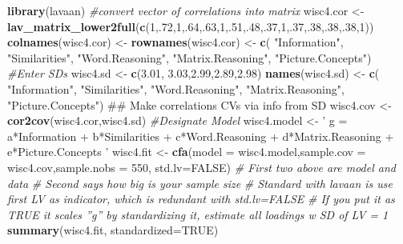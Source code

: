 \documentclass[]{book}
\newenvironment{Shaded}{\begin{snugshade}}{\end{snugshade}}
\newcommand{\KeywordTok}[1]{\textcolor[rgb]{0.13,0.29,0.53}{\textbf{#1}}}
\newcommand{\DataTypeTok}[1]{\textcolor[rgb]{0.13,0.29,0.53}{#1}}
\newcommand{\DecValTok}[1]{\textcolor[rgb]{0.00,0.00,0.81}{#1}}
\newcommand{\FloatTok}[1]{\textcolor[rgb]{0.00,0.00,0.81}{#1}}
\newcommand{\StringTok}[1]{\textcolor[rgb]{0.31,0.60,0.02}{#1}}
\newcommand{\CommentTok}[1]{\textcolor[rgb]{0.56,0.35,0.01}{\textit{#1}}}
\newcommand{\OtherTok}[1]{\textcolor[rgb]{0.56,0.35,0.01}{#1}}
\newcommand{\NormalTok}[1]{#1}
\theoremstyle{definition}
\theoremstyle{definition}
\theoremstyle{definition}
\theoremstyle{remark}
\begin{document}
\begin{Shaded}
\begin{Highlighting}[]
\KeywordTok{library}\NormalTok{(lavaan)}
\CommentTok{#convert vector of correlations into matrix}
\NormalTok{wisc4.cor <-}\StringTok{ }\KeywordTok{lav_matrix_lower2full}\NormalTok{(}\KeywordTok{c}\NormalTok{(}\DecValTok{1}\NormalTok{,.}\DecValTok{72}\NormalTok{,}\DecValTok{1}\NormalTok{,.}\DecValTok{64}\NormalTok{,.}\DecValTok{63}\NormalTok{,}\DecValTok{1}\NormalTok{,.}\DecValTok{51}\NormalTok{,.}\DecValTok{48}\NormalTok{,.}\DecValTok{37}\NormalTok{,}\DecValTok{1}\NormalTok{,.}\DecValTok{37}\NormalTok{,.}\DecValTok{38}\NormalTok{,.}\DecValTok{38}\NormalTok{,.}\DecValTok{38}\NormalTok{,}\DecValTok{1}\NormalTok{))}
\KeywordTok{colnames}\NormalTok{(wisc4.cor) <-}\StringTok{ }\KeywordTok{rownames}\NormalTok{(wisc4.cor) <-}\StringTok{ }\KeywordTok{c}\NormalTok{(}
  \StringTok{"Information"}\NormalTok{,}
  \StringTok{"Similarities"}\NormalTok{,}
  \StringTok{"Word.Reasoning"}\NormalTok{,}
  \StringTok{"Matrix.Reasoning"}\NormalTok{,}
  \StringTok{"Picture.Concepts"}\NormalTok{)}
\CommentTok{#Enter SDs }
\NormalTok{wisc4.sd <-}\StringTok{ }\KeywordTok{c}\NormalTok{(}\FloatTok{3.01}\NormalTok{, }\FloatTok{3.03}\NormalTok{,}\FloatTok{2.99}\NormalTok{,}\FloatTok{2.89}\NormalTok{,}\FloatTok{2.98}\NormalTok{)}
\KeywordTok{names}\NormalTok{(wisc4.sd) <-}\StringTok{ }\KeywordTok{c}\NormalTok{(}
  \StringTok{"Information"}\NormalTok{,}
  \StringTok{"Similarities"}\NormalTok{,}
  \StringTok{"Word.Reasoning"}\NormalTok{,}
  \StringTok{"Matrix.Reasoning"}\NormalTok{,}
  \StringTok{"Picture.Concepts"}\NormalTok{) }
\NormalTok{## Make correlations CVs via info from SD}
\NormalTok{wisc4.cov <-}\StringTok{ }\KeywordTok{cor2cov}\NormalTok{(wisc4.cor,wisc4.sd)}
\CommentTok{#Designate Model }
\NormalTok{wisc4.model <-}\StringTok{ '}
\StringTok{g =~ a*Information + b*Similarities + c*Word.Reasoning + d*Matrix.Reasoning + e*Picture.Concepts}
\StringTok{'}
\NormalTok{wisc4.fit <-}\StringTok{ }\KeywordTok{cfa}\NormalTok{(}\DataTypeTok{model =}\NormalTok{ wisc4.model,}\DataTypeTok{sample.cov =}\NormalTok{ wisc4.cov,}\DataTypeTok{sample.nobs =} \DecValTok{550}\NormalTok{, }\DataTypeTok{std.lv=}\OtherTok{FALSE}\NormalTok{)}
\CommentTok{# First two above are model and data }
\CommentTok{# Second says how big is your sample size}
\CommentTok{# Standard with lavaan is use first LV as indicator, which is redundant with std.lv=FALSE}
\CommentTok{# If you put it as TRUE it scales ''g'' by standardizing it, estimate all loadings w SD of LV = 1}
\KeywordTok{summary}\NormalTok{(wisc4.fit, }\DataTypeTok{standardized=}\OtherTok{TRUE}\NormalTok{)}
\end{Highlighting}
\end{Shaded}
\end{document}
